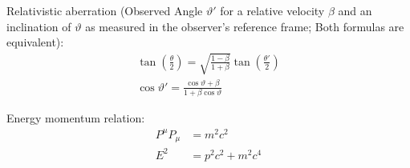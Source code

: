 			\noindent
			Relativistic aberration (Observed Angle $\vartheta'$ for a relative velocity $\beta$ and an inclination of $\vartheta$ as measured in the observer's reference frame; Both formulas are equivalent):
			\begin{equation}
				\begin{aligned}
					\tan\left(\frac{\theta}{2}\right) = \sqrt{\frac{1-\beta}{1+\beta}}\tan\left(\frac{\theta'}{2}\right)\\
					\cos\vartheta' = \frac{\cos\vartheta+\beta}{1+\beta\cos\vartheta}
				\end{aligned}
			\end{equation}

			\noindent
			Energy momentum relation:
			\begin{equation}
				\begin{aligned}
					P^\mu P_\mu &= m^2 c^2\\
					E^2 &= p^2 c^2 + m^2 c^4 \\
				\end{aligned}
			\end{equation}
			\newpage

